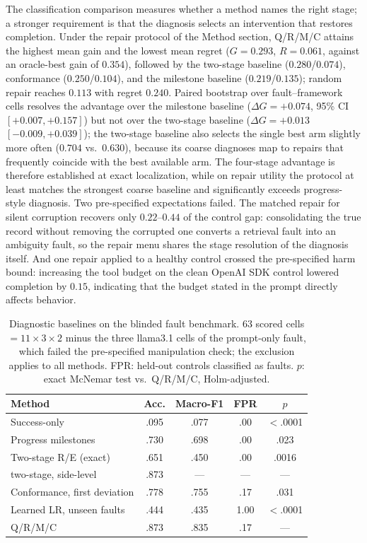 \documentclass[letterpaper]{article} %
\begin{document}
The classification comparison measures whether a method names the right stage; a stronger requirement is that the diagnosis selects an intervention that restores completion. Under the repair protocol of the Method section, Q/R/M/C attains the highest mean gain and the lowest mean regret ($G=0.293$, $R=0.061$, against an oracle-best gain of $0.354$), followed by the two-stage baseline ($0.280$/$0.074$), conformance ($0.250$/$0.104$), and the milestone baseline ($0.219$/$0.135$); random repair reaches $0.113$ with regret $0.240$. Paired bootstrap over fault--framework cells resolves the advantage over the milestone baseline ($\Delta G=+0.074$, 95\% CI $[+0.007,+0.157]$) but not over the two-stage baseline ($\Delta G=+0.013$ $[-0.009,+0.039]$); the two-stage baseline also selects the single best arm slightly more often ($0.704$ vs.\ $0.630$), because its coarse diagnoses map to repairs that frequently coincide with the best available arm. The four-stage advantage is therefore established at exact localization, while on repair utility the protocol at least matches the strongest coarse baseline and significantly exceeds progress-style diagnosis. Two pre-specified expectations failed. The matched repair for silent corruption recovers only $0.22$--$0.44$ of the control gap: consolidating the true record without removing the corrupted one converts a retrieval fault into an ambiguity fault, so the repair menu shares the stage resolution of the diagnosis itself. And one repair applied to a healthy control crossed the pre-specified harm bound: increasing the tool budget on the clean OpenAI SDK control lowered completion by $0.15$, indicating that the budget stated in the prompt directly affects behavior.

\begin{table}[t]
\caption{Diagnostic baselines on the blinded fault benchmark. 63
scored cells $=11\times3\times2$ minus the three llama3.1 cells of
the prompt-only fault, which failed the pre-specified manipulation
check; the exclusion applies to all methods. FPR: held-out controls
classified as faults. $p$: exact McNemar test vs.\ Q/R/M/C,
Holm-adjusted.}
\label{tab:baselines}
\centering
\small
\setlength{\tabcolsep}{4pt}
\begin{tabular}{lcccc}
\toprule
Method & Acc. & Macro-F1 & FPR & $p$ \\
\midrule
Success-only & .095 & .077 & .00 & $<$.0001 \\
Progress milestones & .730 & .698 & .00 & .023 \\
Two-stage R/E (exact) & .651 & .450 & .00 & .0016 \\
\quad two-stage, side-level & .873 & --- & --- & --- \\
Conformance, first deviation & .778 & .755 & .17 & .031 \\
Learned LR, unseen faults & .444 & .435 & 1.00 & $<$.0001 \\
Q/R/M/C & .873 & .835 & .17 & --- \\
\bottomrule
\end{tabular}
\end{table}
\end{document}
